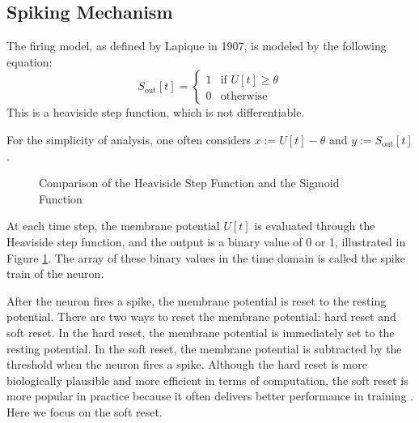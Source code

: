     \subsection{Spiking Mechanism}
    \label{subsec:lif_spiking}
        The firing model, as defined by Lapique in 1907, is modeled by the following equation:
        \begin{equation}
            S_{\text{out}}[t] = \begin{cases}
                1 & \text{if } U[t] \geq \theta \\
                0 & \text{otherwise}
            \end{cases}
        \end{equation}
        This is a heaviside step function, which is not differentiable. 

        For the simplicity of analysis, one often considers $x := U[t] - \theta$ and $y := S_{\text{out}}[t]$.
        \begin{figure}[!htpb]
            \centering
            \caption{Comparison of the Heaviside Step Function and the Sigmoid Function}
            \label{fig:heaviside_sigmoid}
        \end{figure}
        At each time step, the membrane potential $U[t]$ is evaluated through the Heaviside step function, and the output is a binary value of 0 or 1, illustrated in Figure \ref{fig:heaviside_sigmoid}. The array of these binary values in the time domain is called the spike train of the neuron. 

        After the neuron fires a spike, the membrane potential is reset to the resting potential. There are two ways to reset the membrane potential: hard reset and soft reset. In the hard reset, the membrane potential is immediately set to the resting potential. In the soft reset, the membrane potential is subtracted by the threshold when the neuron fires a spike. Although the hard reset is more biologically plausible and more efficient in terms of computation, the soft reset is more popular in practice because it often delivers better performance in training \cite{10242251}. Here we focus on the soft reset.


